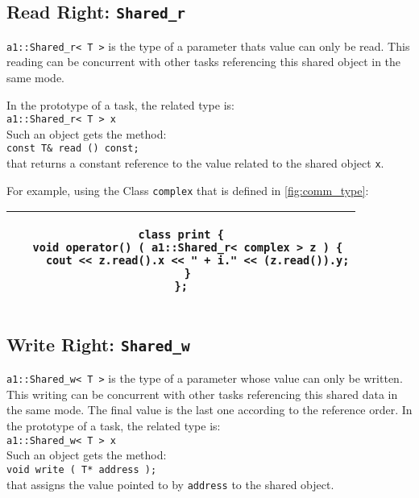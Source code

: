 \subsection{Read Right: \texttt{Shared\_r} }
\verb+a1::Shared_r< T >+ is the type of a parameter thats value
can only be read.
 This reading can be concurrent with other tasks referencing this
 shared object in the same mode.

 In the prototype of a task, the related type is: \\
 { \verb+a1::Shared_r< T > x+ } \\
 Such an object gets the method: \\
 { \verb+const T& read () const; + } \\
 that returns a constant reference to the value related to the shared object
 \verb!x!.

For example, using the Class \verb!complex! that is defined in \ref{fig:comm_type}:\\
\begin{center}
\begin{tabular}{|c|}
\hline
\rule{0mm}{4mm}%
\begin{minipage}[t]{124mm}
\begin{verbatim}
class print {
  void operator() ( a1::Shared_r< complex > z ) {
     cout << z.read().x << " + i." << (z.read()).y;
  }
};
\end{verbatim}
\end{minipage} \\
\hline
\end{tabular}
\end{center}

\subsection{Write Right: \texttt{Shared\_w} }
\verb+a1::Shared_w< T >+ is the type of a parameter whose value can only be written. This writing can be 
concurrent with other tasks referencing this shared data in the same mode. The final value is the 
last one according to the reference order. In the prototype of a task, the related type is:  \\
 { \verb+a1::Shared_w< T > x+ } \\
 Such an object gets the method: \\
 { \verb+void write ( T* address ); +} \\
 that assigns the value pointed to by {\verb+address+}  to the shared object.
 

